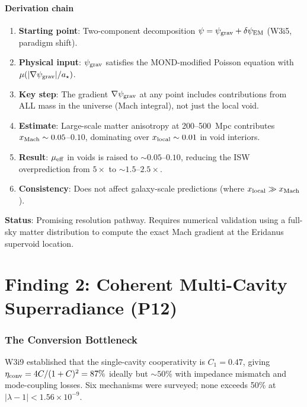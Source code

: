 \documentclass[11pt]{article}
\newcommand{\ee}[1]{\times 10^{#1}}
\newcommand{\psigrav}{\psi_{\rm grav}}
\newcommand{\dpsiEM}{\delta\psi_{\rm EM}}
\newcommand{\lambdaone}{|\lambda{-}1|}
\newcommand{\mufd}{\mu}
\begin{document}
\subsection{Derivation chain}

\begin{enumerate}
\item \textbf{Starting point}: Two-component decomposition $\psi
  = \psigrav + \dpsiEM$ (W3i5, paradigm shift).
\item \textbf{Physical input}: $\psigrav$ satisfies the MOND-modified
  Poisson equation with $\mufd(|\nabla\psigrav|/a_\star)$.
\item \textbf{Key step}: The gradient $\nabla\psigrav$ at any point
  includes contributions from ALL mass in the universe (Mach integral),
  not just the local void.
\item \textbf{Estimate}: Large-scale matter anisotropy at 200--500~Mpc
  contributes $x_{\rm Mach} \sim 0.05$--$0.10$, dominating over
  $x_{\rm local} \sim 0.01$ in void interiors.
\item \textbf{Result}: $\mufd_{\rm eff}$ in voids is raised to $\sim
  0.05$--$0.10$, reducing the ISW overprediction from $5\times$ to
  $\sim 1.5$--$2.5\times$.
\item \textbf{Consistency}: Does not affect galaxy-scale predictions
  (where $x_{\rm local} \gg x_{\rm Mach}$).
\end{enumerate}

\textbf{Status}: Promising resolution pathway. Requires numerical
validation using a full-sky matter distribution to compute the exact
Mach gradient at the Eridanus supervoid location.


\part{Finding 2: Coherent Multi-Cavity Superradiance (P12)}
\label{part:P12}

\section{The Conversion Bottleneck}

W3i9 established that the single-cavity cooperativity is $C_1 = 0.47$,
giving $\eta_{\rm conv} = 4C/(1+C)^2 = 87\%$ ideally but $\sim 50\%$
with impedance mismatch and mode-coupling losses. Six mechanisms were
surveyed; none exceeds 50\% at $\lambdaone < 1.56\ee{-9}$.
\end{document}

